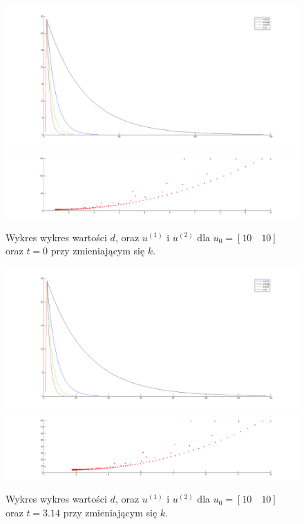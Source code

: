 \documentclass[a4paper,10pt]{article}
\begin{document}
\begin{figure}[!h]
    \centering
	\includegraphics[width=120mm]{CW4-alg1fun2-u10_10-k001_01-t0-d.png}
	\includegraphics[width=120mm]{CW4-alg1fun2-u10_10-k001_01-t0-u.png}
	\caption{Wykres wykres wartości $d$, oraz $u^{(1)}$ i $u^{(2)}$ dla $u_0=[10 \quad 10]$ oraz $t=0$ przy zmieniającym się $k$.}
    \label{fig:Rysunek}
\end{figure}
\begin{figure}[!h]
    \centering
	\includegraphics[width=120mm]{CW4-alg1fun2-u10_10-k001_01-t314-d.png}
	\includegraphics[width=120mm]{CW4-alg1fun2-u10_10-k001_01-t314-u.png}
	\caption{Wykres wykres wartości $d$, oraz $u^{(1)}$ i $u^{(2)}$ dla $u_0=[10 \quad 10]$ oraz $t=3.14$ przy zmieniającym się $k$.}
    \label{fig:Rysunek}
\end{figure}
\end{document}
